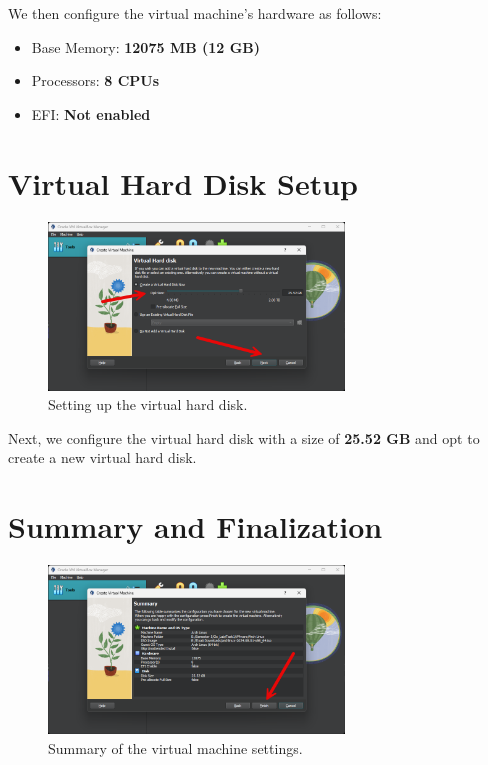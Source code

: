 \documentclass{article}
\begin{document}
We then configure the virtual machine's hardware as follows:
\begin{itemize}
    \item Base Memory: \textbf{12075 MB (12 GB)}
    \item Processors: \textbf{8 CPUs}
    \item EFI: \textbf{Not enabled}
\end{itemize}

\section{Virtual Hard Disk Setup}
\begin{figure}[H]
    \centering
    \includegraphics[width=0.7\textwidth]{5.png}
    \caption{Setting up the virtual hard disk.}
\end{figure}

Next, we configure the virtual hard disk with a size of \textbf{25.52 GB} and opt to create a new virtual hard disk.

\section{Summary and Finalization}
\begin{figure}[H]
    \centering
    \includegraphics[width=0.7\textwidth]{6.png}
    \caption{Summary of the virtual machine settings.}
\end{figure}
\end{document}
